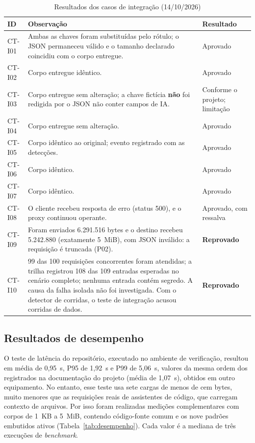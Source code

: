 \begin{table}[htb]
\centering
\caption{Resultados dos casos de integração (14/10/2026)}\label{tab:res_int}
\small
\begin{tabular}{|p{1.35cm}|p{9.6cm}|p{2.5cm}|}
\hline
\textbf{ID} & \textbf{Observação} & \textbf{Resultado} \\ \hline
CT-I01 & Ambas as chaves foram substituídas pelo rótulo; o JSON permaneceu válido e o tamanho declarado coincidiu com o corpo entregue. & Aprovado \\ \hline
CT-I02 & Corpo entregue idêntico. & Aprovado \\ \hline
CT-I03 & Corpo entregue sem alteração; a chave fictícia \textbf{não} foi redigida por o JSON não conter campos de IA. & Conforme o projeto; limitação \\ \hline
CT-I04 & Corpo entregue sem alteração. & Aprovado \\ \hline
CT-I05 & Corpo idêntico ao original; evento registrado com as detecções. & Aprovado \\ \hline
CT-I06 & Corpo idêntico. & Aprovado \\ \hline
CT-I07 & Corpo idêntico. & Aprovado \\ \hline
CT-I08 & O cliente recebeu resposta de erro (status 500), e o proxy continuou operante. & Aprovado, com ressalva \\ \hline
CT-I09 & Foram enviados 6.291.516 bytes e o destino recebeu 5.242.880 (exatamente 5~MiB), com JSON inválido: a requisição é truncada (P02). & \textbf{Reprovado} \\ \hline
CT-I10 & 99 das 100 requisições concorrentes foram atendidas; a trilha registrou 108 das 109 entradas esperadas no cenário completo; nenhuma entrada contém segredo. A causa da falha isolada não foi investigada. Com o detector de corridas, o teste de integração acusou corridas de dados. & \textbf{Reprovado} \\ \hline
\end{tabular}
\end{table}

\subsection{Resultados de desempenho}

O teste de latência do repositório, executado no ambiente de verificação, resultou em média de 0,95~\textmu s, P95 de 1,92~\textmu s e P99 de 5,06~\textmu s, valores da mesma ordem dos registrados na documentação do projeto (média de 1,07~\textmu s), obtidos em outro equipamento. No entanto, esse teste usa sete cargas de menos de cem bytes, muito menores que as requisições reais de assistentes de código, que carregam contexto de arquivos. Por isso foram realizadas medições complementares com corpos de 1~KB a 5~MiB, contendo código-fonte comum e os nove padrões embutidos ativos (Tabela~\ref{tab:desempenho}). Cada valor é a mediana de três execuções de \textit{benchmark}.

